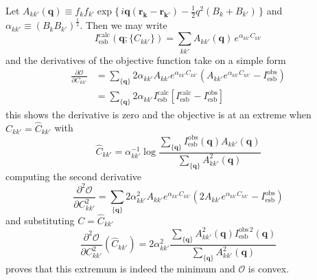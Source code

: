 \documentclass{article}
\begin{document}
Let $A_{k k'} (\mathbf{q}) \equiv f_{k}f_{k'} \exp \{ \, i \mathbf{q} (\mathbf{r_{k}}- \mathbf{r_{k'}}) - \frac{1}{2} q^2(B_k + B_{k'} ) \, \}$ and $\alpha_{k k'} \equiv (B_k B_{k'})^\frac{1}{2}$. Then we may write
\[
I_\mathrm{esb}^\mathrm{calc} (\mathbf{q}; \{ C_{kk'} \}) = \sum_{k k'} A_{k k'} (\mathbf{q}) \, e^{\alpha_{k k'} C_{k k'}}
\]
and the derivatives of the objective function take on a simple form
\begin{align*}
\frac{\partial \mathcal{O}} {\partial C_{kk'}} &= \sum_{\{\mathbf{q}\}}
2 \alpha_{k k'} A_{k k'} e^{\alpha_{k k'} C_{k k'}} 
\left( A_{k k'} e^{\alpha_{k k'} C_{k k'}} - I_\mathrm{esb}^\mathrm{obs}  \right) \\
%
&= \sum_{\{\mathbf{q}\}} 2 \alpha_{k k'} I_\mathrm{esb}^\mathrm{calc} \left[
I_\mathrm{esb}^\mathrm{calc} - I_\mathrm{esb}^\mathrm{obs}
\right]
\end{align*}
this shows the derivative is zero and the objective is at an extreme when $C_{kk'} = \hat{C}_{kk'}$ with
\[
\hat{C}_{kk'} = \alpha_{kk'}^{-1} 
\log \frac{ \sum_{\{\mathbf{q}\}} I_\mathrm{esb}^\mathrm{obs} (\mathbf{q}) A_{kk'} (\mathbf{q})}
{\sum_{\{\mathbf{q}\}} A_{kk'}^2 (\mathbf{q}) }
\]
computing the second derivative
\[
\frac{\partial^2 \mathcal{O}} {\partial C_{kk'}^2} = \sum_{\{\mathbf{q}\}}
2 \alpha_{k k'}^2 A_{k k'} e^{\alpha_{k k'} C_{k k'}} 
\left( 2 A_{k k'} e^{\alpha_{k k'} C_{k k'}} - I_\mathrm{esb}^\mathrm{obs} \right)
\]
and substituting $C = \hat{C}_{kk'}$
\[
\frac{\partial^2 \mathcal{O}} {\partial C_{kk'}^2} (\hat{C}_{kk'}) =  2 \alpha_{k k'}^2 
\frac{\sum_{\{\mathbf{q}\}} A_{kk'}^2 (\mathbf{q})I_\mathrm{esb}^{\mathrm{obs}\, 2}(\mathbf{q})}
{\sum_{\{\mathbf{q}\}} A_{kk'}^2 (\mathbf{q})}
\]
proves that this extremum is indeed the minimum and $\mathcal{O}$ is convex.


\end{document}

